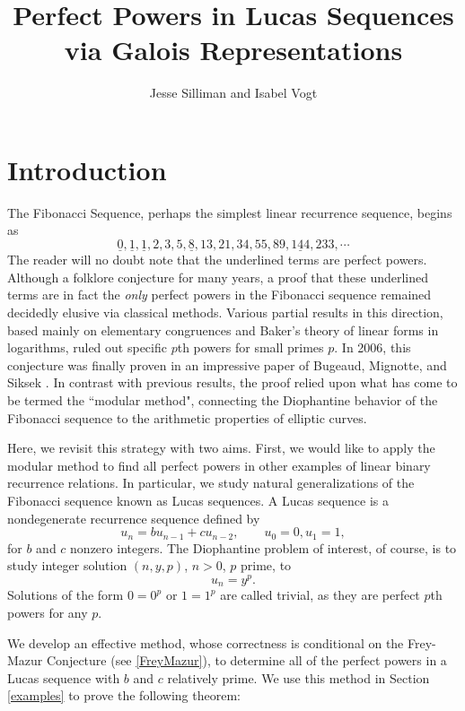\documentclass[12pt]{amsart}
\theoremstyle{definition}
\begin{document}
\title{Perfect Powers in Lucas Sequences via Galois Representations}
\author{Jesse Silliman and Isabel Vogt}

\maketitle


\section{Introduction}
The Fibonacci Sequence, perhaps the simplest linear recurrence sequence, begins as \[\underline{0},\underline{1},\underline{1},2,3,5,\underline{8},13,21,34,55,89,\underline{144},233, \cdots\] The reader will no doubt note that the underlined terms are perfect powers. Although a folklore conjecture for many years, a proof that these underlined terms are in fact the \emph{only} perfect powers in the Fibonacci sequence remained decidedly elusive via classical methods. Various partial results in this direction, based mainly on elementary congruences and Baker's theory of linear forms in logarithms, ruled out specific $p$th powers for small primes $p$. In 2006, this conjecture was finally proven in an impressive paper of Bugeaud, Mignotte, and Siksek \cite{siksek06}. In contrast with previous results, the proof relied upon what has come to be termed the ``modular method", connecting the Diophantine behavior of the Fibonacci sequence to the arithmetic properties of elliptic curves.

Here, we revisit this strategy with two aims. First, we would like to apply the modular method to find all perfect powers in other examples of linear binary recurrence relations.  In particular, we study natural generalizations of the Fibonacci sequence known as Lucas sequences.  A Lucas sequence is a nondegenerate recurrence sequence defined by \[ u_n = b u_{n-1} + c u_{n-2}, \qquad u_0 = 0, u_1 = 1, \] for $b$ and $c$ nonzero integers.  The Diophantine problem of interest, of course, is to study integer solution $(n,y,p)$, $n > 0$, $p$ prime, to \begin{equation}\label{the_eqn}u_n = y^p.\end{equation}
Solutions of the form $0=0^p$ or $1 = 1^p$ are called trivial, as they are perfect $p$th powers for any $p$. 

We develop an effective method, whose correctness is conditional on the Frey-Mazur Conjecture (see \ref{FreyMazur}), to determine all of the perfect powers in a Lucas sequence with $b$ and $c$ relatively prime.  We use this method in Section \ref{examples} to prove the following theorem:
\end{document}
